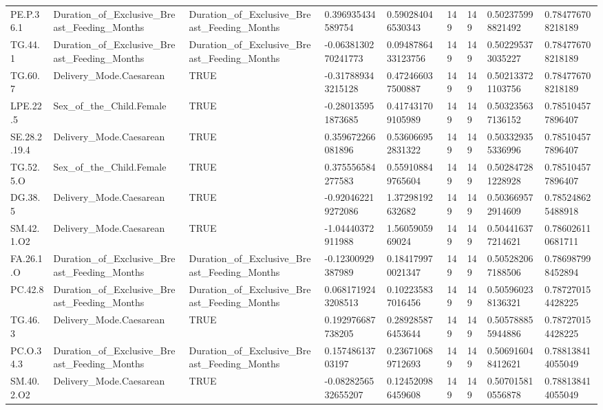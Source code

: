 \begin{longtable}{lllllllll}
PE.P.36.1 & Duration\_of\_Exclusive\_Breast\_Feeding\_Months & Duration\_of\_Exclusive\_Breast\_Feeding\_Months & 0.396935434589754 & 0.590284046530343 & 149 & 149 & 0.502375998821492 & 0.784776708218189 \\
TG.44.1 & Duration\_of\_Exclusive\_Breast\_Feeding\_Months & Duration\_of\_Exclusive\_Breast\_Feeding\_Months & -0.0638130270241773 & 0.0948786433123756 & 149 & 149 & 0.502295373035227 & 0.784776708218189 \\
TG.60.7 & Delivery\_Mode.Caesarean & TRUE & -0.317889343215128 & 0.472466037500887 & 149 & 149 & 0.502133721103756 & 0.784776708218189 \\
LPE.22.5 & Sex\_of\_the\_Child.Female & TRUE & -0.280135951873685 & 0.417431709105989 & 149 & 149 & 0.503235637136152 & 0.785104577896407 \\
SE.28.2.19.4 & Delivery\_Mode.Caesarean & TRUE & 0.359672266081896 & 0.536066952831322 & 149 & 149 & 0.503329355336996 & 0.785104577896407 \\
TG.52.5.O & Sex\_of\_the\_Child.Female & TRUE & 0.375556584277583 & 0.559108849765604 & 149 & 149 & 0.502847281228928 & 0.785104577896407 \\
DG.38.5 & Delivery\_Mode.Caesarean & TRUE & -0.920462219272086 & 1.37298192632682 & 149 & 149 & 0.503669572914609 & 0.785248625488918 \\
SM.42.1.O2 & Delivery\_Mode.Caesarean & TRUE & -1.04440372911988 & 1.5605905969024 & 149 & 149 & 0.504416377214621 & 0.786026110681711 \\
FA.26.1.O & Duration\_of\_Exclusive\_Breast\_Feeding\_Months & Duration\_of\_Exclusive\_Breast\_Feeding\_Months & -0.12300929387989 & 0.184179970021347 & 149 & 149 & 0.505282067188506 & 0.786987998452894 \\
PC.42.8 & Duration\_of\_Exclusive\_Breast\_Feeding\_Months & Duration\_of\_Exclusive\_Breast\_Feeding\_Months & 0.0681719243208513 & 0.102235837016456 & 149 & 149 & 0.505960238136321 & 0.787270154428225 \\
TG.46.3 & Delivery\_Mode.Caesarean & TRUE & 0.192976687738205 & 0.289285876453644 & 149 & 149 & 0.505788855944886 & 0.787270154428225 \\
PC.O.34.3 & Duration\_of\_Exclusive\_Breast\_Feeding\_Months & Duration\_of\_Exclusive\_Breast\_Feeding\_Months & 0.15748613703197 & 0.236710689712693 & 149 & 149 & 0.506916048412621 & 0.788138414055049 \\
SM.40.2.O2 & Delivery\_Mode.Caesarean & TRUE & -0.0828256532655207 & 0.124520986459608 & 149 & 149 & 0.507015810556878 & 0.788138414055049 \\

\end{longtable}
